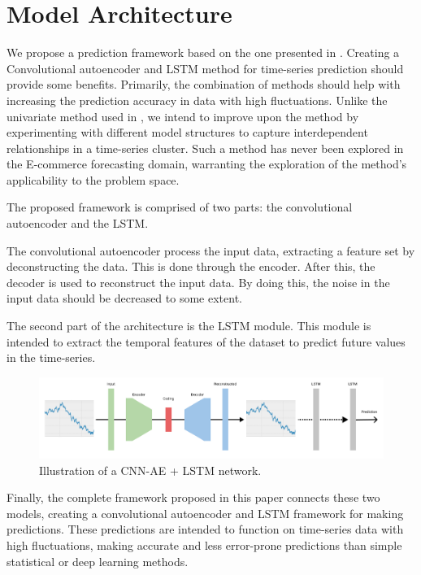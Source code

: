 \section{Model Architecture}
\label{section:Architecture:HybridModel}

We propose a prediction framework based on the one presented in \cite{Zhao2019}.
Creating a Convolutional autoencoder and LSTM method for time-series prediction should provide some benefits.
Primarily, the combination of methods should help with increasing the prediction accuracy in data with high fluctuations.
Unlike the univariate method used in \cite{Zhao2019},
we intend to improve upon the method by experimenting with different model structures to capture interdependent relationships in a time-series cluster.
Such a method has never been explored in the E-commerce forecasting domain, warranting the exploration of the method's applicability to the problem space.

The proposed framework is comprised of two parts: the convolutional autoencoder and the LSTM.

The convolutional autoencoder process the input data, extracting a feature set by deconstructing the data.
This is done through the encoder. After this, the decoder is used to reconstruct the input data.
By doing this, the noise in the input data should be decreased to some extent.

The second part of the architecture is the LSTM module.
This module is intended to extract the temporal features of the dataset
to predict future values in the time-series.

\begin{figure}[h!]
  \centering
  \includegraphics[width=\textwidth]{./figs/illustrations/CNN-AE + LSTM.png}
  \hfill
  \caption{Illustration of a CNN-AE + LSTM network.}
  \label{fig:cnn-ae+lstm-network}
\end{figure}

Finally, the complete framework proposed in this paper connects these two models,
creating a convolutional autoencoder and LSTM framework for making predictions.
These predictions are intended to function on time-series data with high fluctuations,
making accurate and less error-prone predictions than simple statistical or deep learning methods.


